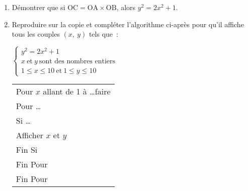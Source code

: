 \begin{enumerate}
     \item Démontrer que si $\text{OC} = \text{OA} \times \text{OB}$, alors $y^2 = 2x^2 + 1$.
     \item Reproduire sur la copie et compléter l'algorithme ci-après pour qu'il affiche tous les couples $(x,~y)$ tels que~:
\begin{center}
$\left\{\begin{array}{l}
              y^2 = 2x^2 + 1\\
              x~\text{et}~y~\text{sont des nombres entiers} \\
              1  \leqslant x \leqslant 10 ~\text{et}~ 1 \leqslant y \leqslant 10
     \end{array}\right.$
\end{center}
     \begin{center}
 \begin{extern}%
          \begin{tabular}{|l|}\hline
               Pour $x$ allant de 1 à \ldots faire\\
               \hspace{0.5cm}Pour \ldots\\
               \hspace{1cm}Si \ldots\\
               \hspace{1.5cm}Afficher $x$ et $y$\\
               \hspace{1cm}Fin Si\\
               \hspace{0.5cm}Fin Pour\\
               Fin Pour\\ \hline
          \end{tabular}
 \end{extern}
 

\end{center}
\end{enumerate}
